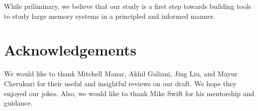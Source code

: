 \documentclass[twocolumn,11pt]{article}
\begin{document}
While priliminary, we believe that our study is a first step towards building tools 
to study large memory systems in a principled and informed manner. 
 

\section{Acknowledgements}

We would like to thank Mitchell Manar, Akhil Guliani, Jing Liu, and Mayur
Cherukuri for their useful and insightful reviews on our draft. We hope they
enjoyed our jokes. Also, we would like to thank Mike Swift for his mentorship
and guidance.


{}

\end{document}
